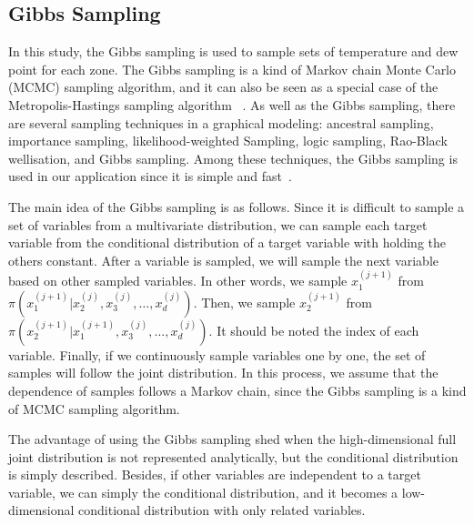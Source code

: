 \documentclass[journal]{IEEEtran} %
\begin{document}




\subsection{Gibbs Sampling}
In this study, the Gibbs sampling is used to sample sets of temperature and dew point for each zone. The Gibbs sampling is a kind of Markov chain Monte Carlo (MCMC) sampling algorithm, and it can also be seen as a special case of the Metropolis-Hastings sampling algorithm~\cite{Bishop} . As well as the Gibbs sampling, there are several sampling techniques in a graphical modeling: ancestral sampling, importance sampling, likelihood-weighted Sampling, logic sampling, Rao-Black wellisation, and Gibbs sampling. Among these techniques, the Gibbs sampling is used in our application since it is simple and fast~\cite{Gibbs}.


The main idea of the Gibbs sampling is as follows. Since it is difficult to sample a set of variables from a multivariate distribution, we can sample each target variable from the conditional distribution of a target variable with holding the others constant. After a variable is sampled, we will sample the next variable based on other sampled variables. In other words, we sample $x_1^{(j + 1)}$ from $\pi (x_1^{(j + 1)}|x_2^{(j)},x_3^{(j)}, \ldots ,x_d^{(j)})$. Then, we sample $x_2^{(j + 1)}$ from $\pi (x_2^{(j + 1)}|x_1^{(j+1)},x_3^{(j)}, \ldots ,x_d^{(j)})$. It should be noted the index of each variable. Finally, if we continuously sample variables one by one, the set of samples will follow the joint distribution. In this process, we assume that the dependence of samples follows a Markov chain, since the Gibbs sampling is a kind of MCMC sampling algorithm. 

 

 
 
The advantage of using the Gibbs sampling shed when the high-dimensional full joint distribution is not represented analytically, but the conditional distribution is simply described. Besides, if other variables are independent to a target variable, we can simply the conditional distribution, and it becomes a low-dimensional conditional distribution with only related variables.
\end{document}

